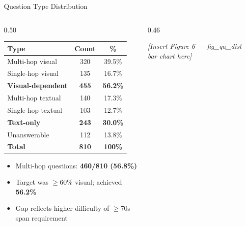 \documentclass[aspectratio=169,t]{beamer}
\begin{document}
\begin{frame}{Question Type Distribution}

\begin{columns}[T]
\begin{column}{0.50\textwidth}
  \small
  \begin{tabular}{lcc}
  \toprule
  Type & Count & \% \\
  \midrule
  Multi-hop visual   & 320 & 39.5\% \\
  Single-hop visual  & 135 & 16.7\% \\
  \midrule
  \textbf{Visual-dependent} & \textbf{455} & \textbf{56.2\%} \\
  \midrule
  Multi-hop textual  & 140 & 17.3\% \\
  Single-hop textual & 103 & 12.7\% \\
  \textbf{Text-only} & \textbf{243} & \textbf{30.0\%} \\
  \midrule
  Unanswerable & 112 & 13.8\% \\
  \midrule
  \textbf{Total} & \textbf{810} & \textbf{100\%} \\
  \bottomrule
  \end{tabular}

  \medskip
  \begin{itemize}
    \item Multi-hop questions: \textbf{460/810 (56.8\%)}
    \item Target was $\geq$60\% visual; achieved \textbf{56.2\%}
    \item Gap reflects higher difficulty of $\geq$70s span requirement
  \end{itemize}
\end{column}
\begin{column}{0.46\textwidth}
  \begin{center}
  \vspace{4pt}
  \fbox{\rule{0pt}{4.8cm}\rule{5.5cm}{0pt}}
  \end{center}
  \vspace{-4pt}
  \footnotesize\centering
  \textit{[Insert Figure 6 — fig\_qa\_dist bar chart here]}
\end{column}
\end{columns}

\end{frame}
\end{document}
